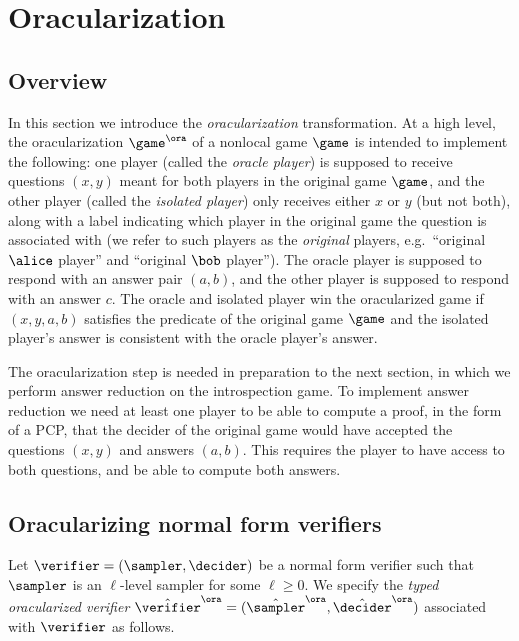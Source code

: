 \section{Oracularization}
\label{sec:oracle}

\newcommand{\tvora}{\hat{\verifier}^\ora}
\newcommand{\tsora}{\hat{\sampler}^\ora}
\newcommand{\tdora}{\hat{\decider}^\ora}

\subsection{Overview}

In this section we introduce the \emph{oracularization} transformation.
At a high level, the oracularization $\game^\ora$ of a nonlocal game $\game$ is
intended to implement the following: one player (called the \emph{oracle
  player}) is supposed to receive questions $(x,y)$ meant for both players in
the original game $\game$, and the other player (called the \emph{isolated
  player}) only receives either $x$ or $y$ (but not both), along with a label
indicating which player in the original game the question is associated with (we
refer to such players as the \emph{original} players, e.g.\ ``original $\alice$
player'' and ``original $\bob$ player'').
The oracle player is supposed to respond with an answer pair $(a,b)$, and the
other player is supposed to respond with an answer $c$.
The oracle and isolated player win the oracularized game if $(x,y,a,b)$
satisfies the predicate of the original game $\game$ and the isolated player's
answer is consistent with the oracle player's answer.

The oracularization step is needed in preparation to the next section, in which
we perform answer reduction on the introspection game.
To implement answer reduction we need at least one player to be able to compute
a proof, in the form of a PCP, that the decider of the original game would have
accepted the questions $(x,y)$ and answers $(a,b)$.
This requires the player to have access to both questions, and be able to
compute both answers.

\subsection{Oracularizing normal form verifiers}
\label{sec:orac-def}

Let $\verifier = (\sampler,\decider)$ be a normal form verifier such that
$\sampler$ is an $\ell$-level sampler for some $\ell \geq 0$.
We specify the \emph{typed oracularized verifier} $\tvora =
(\tsora,\tdora)$ associated with $\verifier$ as follows. 


